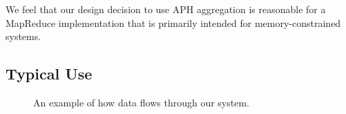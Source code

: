 \documentclass[10pt,letter,final,article,twocolumn]{article} %
\begin{document}
We feel that our design decision to use APH aggregation is reasonable for a MapReduce implementation that is primarily intended for memory-constrained systems.

\subsection{Typical Use}

\begin{figure}[htbp]
\begin{center}
\caption{An example of how data flows through our system.}
\label{fig:flow}
\end{center}
\end{figure}
\end{document}
